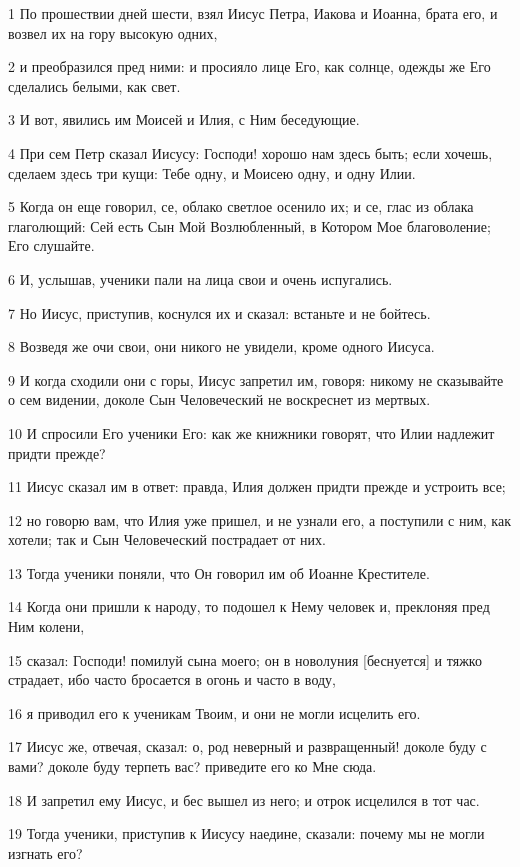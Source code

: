 \par 1 По прошествии дней шести, взял Иисус Петра, Иакова и Иоанна, брата его, и возвел их на гору высокую одних,
\par 2 и преобразился пред ними: и просияло лице Его, как солнце, одежды же Его сделались белыми, как свет.
\par 3 И вот, явились им Моисей и Илия, с Ним беседующие.
\par 4 При сем Петр сказал Иисусу: Господи! хорошо нам здесь быть; если хочешь, сделаем здесь три кущи: Тебе одну, и Моисею одну, и одну Илии.
\par 5 Когда он еще говорил, се, облако светлое осенило их; и се, глас из облака глаголющий: Сей есть Сын Мой Возлюбленный, в Котором Мое благоволение; Его слушайте.
\par 6 И, услышав, ученики пали на лица свои и очень испугались.
\par 7 Но Иисус, приступив, коснулся их и сказал: встаньте и не бойтесь.
\par 8 Возведя же очи свои, они никого не увидели, кроме одного Иисуса.
\par 9 И когда сходили они с горы, Иисус запретил им, говоря: никому не сказывайте о сем видении, доколе Сын Человеческий не воскреснет из мертвых.
\par 10 И спросили Его ученики Его: как же книжники говорят, что Илии надлежит придти прежде?
\par 11 Иисус сказал им в ответ: правда, Илия должен придти прежде и устроить все;
\par 12 но говорю вам, что Илия уже пришел, и не узнали его, а поступили с ним, как хотели; так и Сын Человеческий пострадает от них.
\par 13 Тогда ученики поняли, что Он говорил им об Иоанне Крестителе.
\par 14 Когда они пришли к народу, то подошел к Нему человек и, преклоняя пред Ним колени,
\par 15 сказал: Господи! помилуй сына моего; он в новолуния [беснуется] и тяжко страдает, ибо часто бросается в огонь и часто в воду,
\par 16 я приводил его к ученикам Твоим, и они не могли исцелить его.
\par 17 Иисус же, отвечая, сказал: о, род неверный и развращенный! доколе буду с вами? доколе буду терпеть вас? приведите его ко Мне сюда.
\par 18 И запретил ему Иисус, и бес вышел из него; и отрок исцелился в тот час.
\par 19 Тогда ученики, приступив к Иисусу наедине, сказали: почему мы не могли изгнать его?
